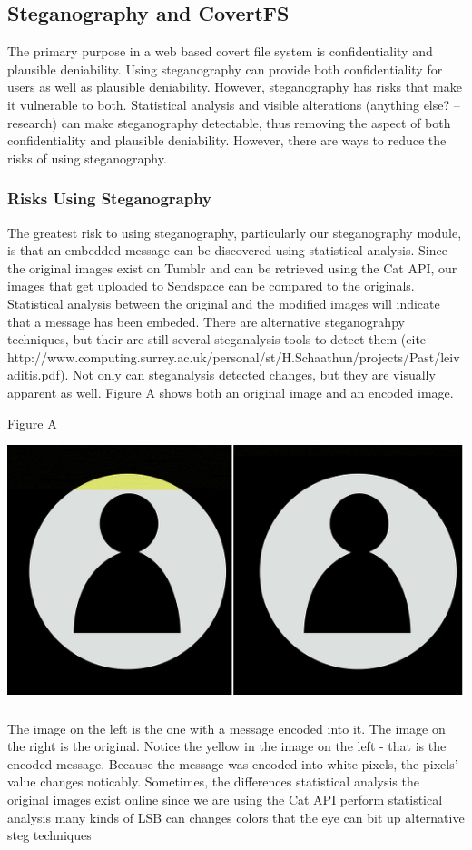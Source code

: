 \subsection{Steganography and CovertFS}
The primary purpose in a web based covert file system is confidentiality and plausible deniability. Using steganography can provide both confidentiality for users as well as plausible deniability. However, steganography has risks that make it vulnerable to both. Statistical analysis and visible alterations (anything else? -- research) can make steganography detectable, thus removing the aspect of both confidentiality and plausible deniability. However, there are ways to reduce the risks of using steganography. 

\subsubsection{Risks Using Steganography}
The greatest risk to using steganography, particularly our steganography module, is that an embedded message can be discovered using statistical analysis. Since the original images exist on Tumblr and can be retrieved using the Cat API, our images that get uploaded to Sendspace can be compared to the originals. Statistical analysis between the original and the modified images will indicate that a message has been embeded. There are alternative steganograhpy techniques, but their are still several steganalysis tools to detect them (cite http://www.computing.surrey.ac.uk/personal/st/H.Schaathun/projects/Past/leivaditis.pdf). Not only can steganalysis detected changes, but they are visually apparent as well. Figure A shows both an original image and an encoded image.
\caption{Figure A}
\includegraphics{comparison}
\subsubsection{}
The image on the left is the one with a message encoded into it. The image on the right is the original. Notice the yellow in the image on the left - that is the encoded message. Because the message was encoded into white pixels, the pixels' value changes noticably.  
Sometimes, the differences 
statistical analysis
		the original images exist online since we are using the Cat API
		perform statistical analysis
	many kinds of LSB can changes colors that the eye can bit up
	alternative steg techniques


